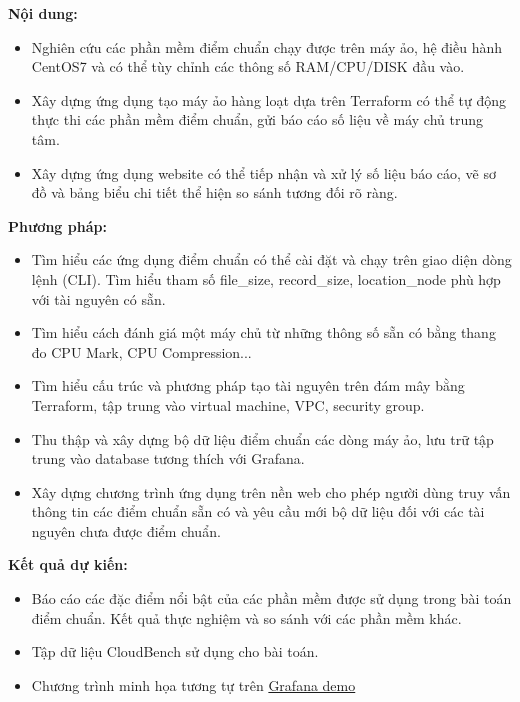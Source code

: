 \documentclass{article}
\begin{document}
\textbf{Nội dung:}
\begin{itemize}
  \item Nghiên cứu các phần mềm điểm chuẩn\cite*{Passmark2023Performancetest, Axboe2023fio, Iozone2016Benchmark, OOKLA2023Speedtest} chạy được trên máy ảo, hệ điều hành CentOS7 và có thể tùy chỉnh các thông số RAM/CPU/DISK đầu vào.
  \item Xây dựng ứng dụng tạo máy ảo hàng loạt dựa trên Terraform \cite*{zadka2022terraform} có thể tự động thực thi các phần mềm điểm chuẩn, gửi báo cáo số liệu về máy chủ trung tâm.
  \item Xây dựng ứng dụng website có thể tiếp nhận và xử lý số liệu báo cáo, vẽ sơ đồ và bảng biểu chi tiết thể hiện so sánh tương đối rõ ràng.
\end{itemize} 

\textbf{Phương pháp:}
\begin{itemize}
  \item Tìm hiểu các ứng dụng điểm chuẩn\cite{Passmark2023Performancetest, Axboe2023fio, Iozone2016Benchmark, OOKLA2023Speedtest} có thể cài đặt và chạy trên giao diện dòng lệnh (CLI). Tìm hiểu tham số file\_size, record\_size, location\_node phù hợp với tài nguyên có sẵn.
  \item Tìm hiểu cách đánh giá một máy chủ từ những thông số sẵn có bằng thang đo CPU Mark, CPU Compression...
  \item Tìm hiểu cấu trúc và phương pháp tạo tài nguyên trên đám mây bằng Terraform, tập trung vào virtual machine, VPC, security group.
  \item Thu thập và xây dựng bộ dữ liệu điểm chuẩn các dòng máy ảo, lưu trữ tập trung vào database tương thích với Grafana.
  \item Xây dựng chương trình ứng dụng trên nền web cho phép người dùng truy vấn thông tin các điểm chuẩn sẵn có và yêu cầu mới bộ dữ liệu đối với các tài nguyên chưa được điểm chuẩn.
\end{itemize}

\textbf{Kết quả dự kiến:}
\begin{itemize}
  \item Báo cáo các đặc điểm nổi bật của các phần mềm được sử dụng trong bài toán điểm chuẩn. Kết quả thực nghiệm và so sánh với các phần mềm khác.
  \item Tập dữ liệu CloudBench sử dụng cho bài toán.
  \item Chương trình minh họa tương tự trên \href{https://play.grafana.org/d/000000016/1-time-series-graphs?orgId=1}{Grafana demo}
\end{itemize}
\printbibliography[heading=bibintoc, title = {Tài liệu tham khảo}]
\end{document}

